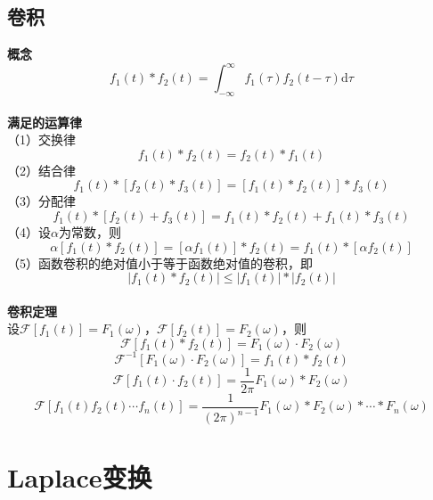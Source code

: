 \documentclass[12pt, a4paper, twoside]{ctexbook}
\begin{document}
\section{卷积}
\textbf{概念}\\
$$
f_1\left(t\right)\ast f_2\left(t\right) = \int_{-\infty}^{\infty}{f_1\left(\tau\right)f_2\left(t-\tau\right)\mathrm{d}\tau}
$$
~\\

\textbf{满足的运算律}\\
\hspace*{4em}（1）交换律
$$
f_1\left(t\right)\ast f_2\left(t\right)=f_2\left(t\right)\ast f_1\left(t\right)
$$
\hspace*{4em}（2）结合律
$$
f_1\left(t\right)\ast \left[f_2\left(t\right)\ast f_3\left(t\right)\right] = \left[f_1\left(t\right)\ast f_2\left(t\right)\right]\ast f_3\left(t\right)
$$
\hspace*{4em}（3）分配律
$$
f_1\left(t\right)\ast \left[f_2\left(t\right)+ f_3\left(t\right)\right] = f_1\left(t\right)\ast f_2\left(t\right)+f_1\left(t\right)\ast f_3\left(t\right)
$$
\hspace*{4em}（4）设$\alpha$为常数，则
$$
\alpha\left[f_1\left(t\right) \ast f_2\left(t\right)\right] = \left[\alpha f_1\left(t\right)\right]\ast f_2\left(t\right)= f_1\left(t\right)\ast\left[\alpha f_2\left(t\right)\right]
$$
\hspace*{4em}（5）函数卷积的绝对值小于等于函数绝对值的卷积，即
$$
\left| f_1\left(t\right) \ast f_2\left(t\right) \right| \leqslant \left| f_1\left(t\right) \right| \ast \left| f_2\left(t\right) \right|
$$
~\\

\textbf{卷积定理}\\
设$\mathscr{F}\left[f_1\left(t\right)\right]=F_1\left(\omega\right)$，$\mathscr{F}\left[f_2\left(t\right)\right]=F_2\left(\omega\right)$，则
$$
\mathscr{F}\left[f_1\left(t\right)\ast f_2\left(t\right)\right] = F_1\left(\omega\right)\cdot F_2\left(\omega\right)
$$
$$
\mathscr{F}^{-1}\left[ F_1\left(\omega\right)\cdot F_2\left(\omega\right) \right] = f_1\left(t\right)\ast f_2\left(t\right)
$$
$$
\mathscr{F}\left[f_1\left(t\right) \cdot f_2\left(t\right)\right] = \frac{1}{2\pi} F_1\left(\omega\right)\ast F_2\left(\omega\right)
$$
$$
\mathscr{F}\left[f_1\left(t\right) f_2\left(t\right) \cdots f_n\left(t\right)\right] = \frac{1}{\left(2\pi\right)^{n-1}} F_1\left(\omega\right)\ast F_2\left(\omega\right)\ast \cdots \ast F_n\left(\omega\right)
$$
\newpage
\chapter{Laplace变换}
\newpage
\end{document}
